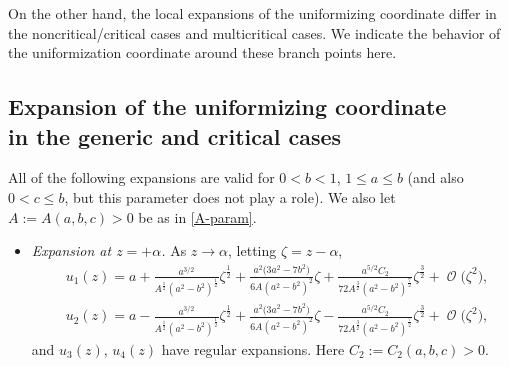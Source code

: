 \documentclass[10pt,a4paper]{amsart}
\DeclareMathOperator{\OO}{\mathcal{O}}
\numberwithin{equation}{section}
\begin{document}
On the other hand, the local expansions of the uniformizing coordinate differ in the noncritical/critical cases and multicritical cases. We indicate the behavior of the uniformization coordinate around these branch points here.

\subsection[Expansion of the uniformizing coordinate in the generic and critical cases]{Expansion of the uniformizing coordinate\\ in the generic and critical cases}
All of the following expansions are valid for $0 < b < 1$, $1\leq a\leq b$ (and also $0<c\leq b$, but this parameter does not play a role). We also let $A:=A(a,b,c) >0$ be as in \eqref{A-param}.
 \begin{itemize}\itemsep=0pt
 \item \textit{Expansion at $z= + \alpha$.}
 As $z\to \alpha$, letting $\zeta = z-\alpha$,
 \begin{align*}
 &u_1(z)= a +\frac{a^{3/2}}{A^{\frac{1}{2}}(a^2-b^2)^{\frac{1}{2}}}\zeta^{\frac{1}{2}} + \frac{a^2\bigl(3a^2-7b^2\bigr)}{6A(a^2-b^2)^2} \zeta + \frac{a^{5/2}C_2}{72A^{\frac{3}{2}}(a^2-b^2)^{\frac{7}{2}}}\zeta^{\frac{3}{2}} + \OO\bigl(\zeta^2\bigr),\\
 &u_2(z)= a-\frac{a^{3/2}}{A^{\frac{1}{2}}(a^2-b^2)^{\frac{1}{2}}}\zeta^{\frac{1}{2}} + \frac{a^2\bigl(3a^2-7b^2\bigr)}{6A(a^2-b^2)^2} \zeta - \frac{a^{5/2}C_2}{72A^{\frac{3}{2}}(a^2-b^2)^{\frac{7}{2}}}\zeta^{\frac{3}{2}} + \OO\bigl(\zeta^2\bigr),
 \end{align*}
 and $u_3(z)$, $u_4(z)$ have regular expansions. Here
$C_2:=C_2(a,b,c)>0$.


\end{itemize}
\end{document}
